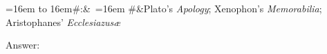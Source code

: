 \hsize=16em
\halign to 16em{\hfill#:&\ \vbox{\hsize=16em #}&Plato’s {\sl Apology\/};
Xenophon’s
{\sl Memorabilia\/};
Aristophanes’
{\sl Ecclesiazus\ae\/}\cr}


Answer:


\bye

